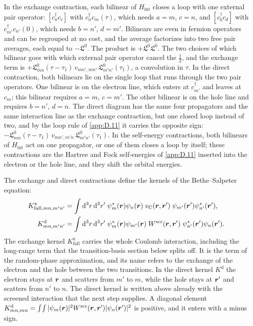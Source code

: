 In the exchange contraction, each bilinear of $H_{\mathrm{int}}$ closes a loop with one external pair operator: $[c^\dagger_ac_c]$ with $c^\dagger_nc_m(\tau)$, which needs $a = m$, $c = n$, and $[c^\dagger_bc_d]$ with $c^\dagger_{m'}c_{n'}(0)$, which needs $b = n'$, $d = m'$. Bilinears are even in fermion operators and can be regrouped at no cost, and the average factorizes into two free pair averages, each equal to $-\mathfrak{L}^0$. The product is $+\mathfrak{L}^0\mathfrak{L}^0$. The two choices of which bilinear goes with which external pair operator cancel the $\tfrac12$, and the exchange term is $+\mathfrak{L}^0_{mn}(\tau - \tau_1)\,v_{mn',nm'}\,\mathfrak{L}^0_{m'n'}(\tau_1)$, a convolution in $\tau$. In the direct contraction, both bilinears lie on the single loop that runs through the two pair operators. One bilinear is on the electron line, which enters at $c^\dagger_{m'}$ and leaves at $c_m$; this bilinear requires $a = m$, $c = m'$. The other bilinear is on the hole line and requires $b = n'$, $d = n$. The direct diagram has the same four propagators and the same interaction line as the exchange contraction, but one closed loop instead of two, and by the loop rule of \cref{app:D.11} it carries the opposite sign: $-\mathfrak{L}^0_{mn}(\tau - \tau_1)\,v_{mn',m'n}\,\mathfrak{L}^0_{m'n'}(\tau_1)$. In the self-energy contractions, both bilinears of $H_{\mathrm{int}}$ act on one propagator, or one of them closes a loop by itself; these contractions are the Hartree and Fock self-energies of \cref{app:D.11} inserted into the electron or the hole line, and they shift the orbital energies.

The exchange and direct contractions define the kernels of the Bethe--Salpeter equation:
\begin{equation}
  \begin{aligned}
  K^{\mathrm{x}}_{\mathrm{full},mn,m'n'} &= \int\mathrm{d}^3r\,\mathrm{d}^3r'\;\psi_m^*(\bm{r})\psi_n(\bm{r})\;v_{\mathrm{C}}(\bm{r},\bm{r}')\;\psi_{m'}(\bm{r}')\psi_{n'}^*(\bm{r}') ,\\
  K^{\mathrm{d}}_{mn,m'n'} &= \int\mathrm{d}^3r\,\mathrm{d}^3r'\;\psi_m^*(\bm{r})\psi_{m'}(\bm{r})\;W^{\mathrm{scr}}(\bm{r},\bm{r}')\;\psi_{n'}^*(\bm{r}')\psi_n(\bm{r}') .
  \end{aligned}
  \label{eq:D.12-kernels}
\end{equation}
The exchange kernel $K^{\mathrm{x}}_{\mathrm{full}}$ carries the whole Coulomb interaction, including the long-range term that the transition-basis section below splits off. It is the term of the random-phase approximation, and its name refers to the exchange of the electron and the hole between the two transitions. In the direct kernel $K^{\mathrm{d}}$ the electron stays at $\bm{r}$ and scatters from $m'$ to $m$, while the hole stays at $\bm{r}'$ and scatters from $n'$ to $n$. The direct kernel is written above already with the screened interaction that the next step supplies. A diagonal element $K^{\mathrm{d}}_{mn,mn} = \int\!\int|\psi_m(\bm{r})|^2W^{\mathrm{scr}}(\bm{r},\bm{r}')|\psi_n(\bm{r}')|^2$ is positive, and it enters with a minus sign.

